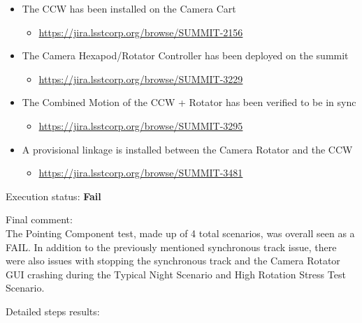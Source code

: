 \documentclass[SE,lsstdraft,STR,toc]{lsstdoc}
\providecommand{\tightlist}{
  \setlength{\itemsep}{0pt}\setlength{\parskip}{0pt}}
\begin{document}
\begin{itemize}
\tightlist
\item
  The CCW has been installed on the Camera Cart

  \begin{itemize}
  \tightlist
  \item
    \url{https://jira.lsstcorp.org/browse/SUMMIT-2156}
  \end{itemize}
\item
  The Camera Hexapod/Rotator Controller has been deployed on the summit

  \begin{itemize}
  \tightlist
  \item
    \url{https://jira.lsstcorp.org/browse/SUMMIT-3229}
  \end{itemize}
\item
  The Combined Motion of the CCW + Rotator has been verified to be in
  sync

  \begin{itemize}
  \tightlist
  \item
    \url{https://jira.lsstcorp.org/browse/SUMMIT-3295}
  \end{itemize}
\item
  A provisional linkage is installed between the Camera Rotator and the
  CCW

  \begin{itemize}
  \tightlist
  \item
    \url{https://jira.lsstcorp.org/browse/SUMMIT-3481}
  \end{itemize}
\end{itemize}


Execution status: {\bf Fail }

Final comment:\\ The Pointing Component test, made up of 4 total scenarios, was overall
seen as a FAIL. In addition to the previously mentioned synchronous
track issue, there were also issues with stopping the synchronous track
and the Camera Rotator GUI crashing during the Typical Night Scenario
and High Rotation Stress Test Scenario.



Detailed steps results:
\end{document}
